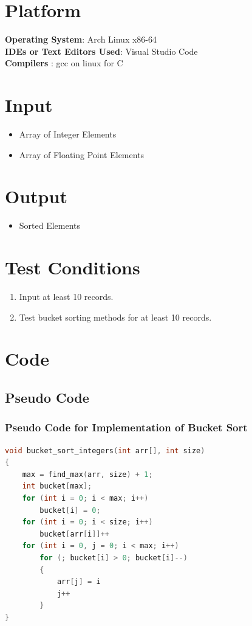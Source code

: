 \documentclass[11pt]{article}
\begin{document}
\section{Platform}
\textbf{Operating System}: Arch Linux x86-64 \\
\textbf{IDEs or Text Editors Used}: Visual Studio Code\\
\textbf{Compilers} : gcc on linux for C\\

\section{Input}

\begin{itemize}
	\item Array of Integer Elements
	\item Array of Floating Point Elements
\end{itemize}

\section{Output}
\begin{itemize}
	\item Sorted Elements
\end{itemize}

\section{Test Conditions}
\begin{enumerate}
	\item Input at least 10 records.
	\item Test bucket sorting methods for at least 10 records.
\end{enumerate}

\section{Code}
\subsection{Pseudo Code}

\subsubsection{Pseudo Code for Implementation of Bucket Sort}
\begin{lstlisting}[language=C]
void bucket_sort_integers(int arr[], int size)
{
	max = find_max(arr, size) + 1;
	int bucket[max];
	for (int i = 0; i < max; i++)
		bucket[i] = 0;
	for (int i = 0; i < size; i++)
		bucket[arr[i]]++ 
	for (int i = 0, j = 0; i < max; i++)
		for (; bucket[i] > 0; bucket[i]--)
		{
			arr[j] = i
			j++
		}
}
\end{lstlisting}
\end{document}
